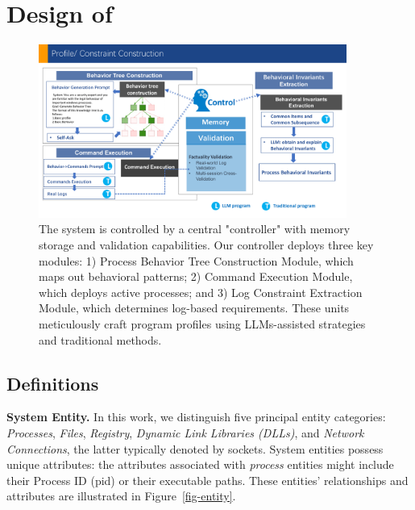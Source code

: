 \section{Design of \tool}

\begin{figure}[h]
    \centering
      \includegraphics[width=0.9\textwidth]{figs/prompt.pdf}
    \caption{The system is controlled by a central "controller" with memory storage and validation capabilities. Our controller deploys three key modules: 1) Process Behavior Tree Construction Module, which maps out behavioral patterns; 2) Command Execution Module, which deploys active processes; and 3) Log Constraint Extraction Module, which determines log-based requirements. These units meticulously craft program profiles using LLMs-assisted strategies and traditional methods.}
    \label{fig-framework-prompt}
    \end{figure}

\subsection{Definitions}

\noindent
{\bf System Entity.}  In this work, we distinguish five principal entity categories: \textit{Processes}, \textit{Files}, \textit{Registry}, \textit{Dynamic Link Libraries (DLLs)}, and \textit{Network Connections}, the latter typically denoted by sockets. System entities possess unique attributes: the attributes associated with \textit{process} entities might include their Process ID (pid) or their executable paths. These entities' relationships and attributes are illustrated in Figure~\ref{fig-entity}. 

